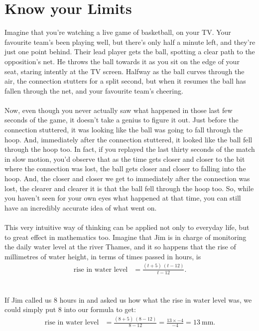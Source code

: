 \documentclass[11pt, leqno]{article}
\numberwithin{equation}{section}
\begin{document}
\section{Know your Limits}
Imagine that you're watching a live game of basketball, on your TV. Your favourite team's been playing well, but there's only half a minute left, and they're just one point behind. Their lead player gets the ball, spotting a clear path to the opposition's net. He throws the ball towards it as you sit on the edge of your seat, staring intently at the TV screen. Halfway as the ball curves through the air, the connection stutters for a split second, but when it resumes the ball has fallen through the net, and your favourite team's cheering. 
\\ \\
Now, even though you never actually saw what happened in those last few seconds of the game, it doesn't take a genius to figure it out. Just before the connection stuttered, it was looking like the ball was going to fall through the hoop. And, immediately after the connection stuttered, it looked like the ball fell through the hoop too. In fact, if you replayed the last thirty seconds of the match in slow motion, you'd observe that as the time gets closer and closer to the bit where the connection was lost, the ball gets closer and closer to falling into the hoop. And, the closer and closer we get to immediately after the connection was lost, the clearer and clearer it is that the ball fell through the hoop too. So, while you haven't seen for your own eyes what happened at that time, you can still have an incredibly accurate idea of what went on.  
\\ \\
This very intuitive way of thinking can be applied not only to everyday life, but to great effect in mathematics too. Imagine that Jim is in charge of monitoring the daily water level at the river Thames, and it so happens that the rise of millimetres of water height, in terms of times passed in hours, is
\begin{align*}
\text{rise in water level} &= \frac{(t + 5) \ (t - 12)}{t - 12}.
\end{align*}
\\ \\
If Jim called us 8 hours in and asked us how what the rise in water level was, we could simply put 8 into our formula to get:
\begin{align*}
\text{rise in water level} &= \frac{(8 + 5) \ (8 - 12)}{8 - 12} = \frac{13 \times -4}{-4} = 13 \ \text{mm.}
\end{align*}
\end{document}
